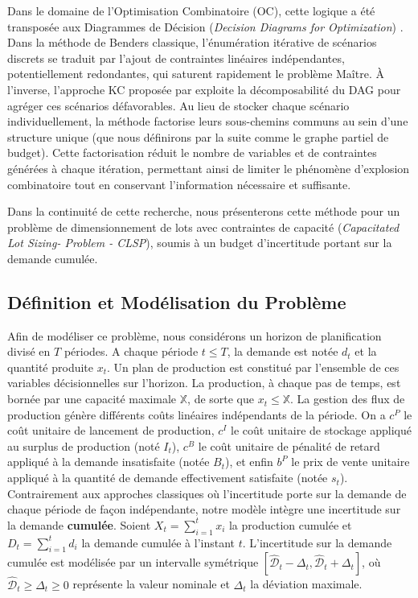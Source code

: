 \documentclass[12pt, a4paper, twoside]{report}
\numberwithin{equation}{section}
\begin{document}
    Dans le domaine de l'Optimisation Combinatoire (OC), cette logique a été transposée aux Diagrammes de Décision (\textit{Decision Diagrams for Optimization}) \cite{bergman2016decision}. Dans la méthode de Benders classique, l'énumération itérative de scénarios discrets se traduit par l'ajout de contraintes linéaires indépendantes, potentiellement redondantes, qui saturent rapidement le problème Maître. À l'inverse, l'approche KC proposée par \cite{portoleauTHESIS} exploite la décomposabilité du DAG pour agréger ces scénarios défavorables. Au lieu de stocker chaque scénario individuellement, la méthode factorise leurs sous-chemins communs au sein d'une structure unique (que nous définirons par la suite comme le graphe partiel de budget). Cette factorisation réduit le nombre de variables et de contraintes générées à chaque itération, permettant ainsi de limiter le phénomène d’explosion combinatoire tout en conservant l'information nécessaire et suffisante.
    
    Dans la continuité de cette recherche, nous présenterons cette méthode pour un problème de dimensionnement de lots avec contraintes de capacité (\textit{Capacitated Lot Sizing- Problem - CLSP}), soumis à un budget d'incertitude portant sur la demande cumulée.

    \subsection{Définition et Modélisation du Problème}
	
	Afin de modéliser ce problème, nous considérons un horizon de planification divisé en $T$ périodes. A chaque période $t\leq T$, la demande est notée $d_t$ et la quantité produite $x_t$. Un plan de production est constitué par l'ensemble de ces variables décisionnelles sur l'horizon. La production, à chaque pas de temps, est bornée par une capacité maximale $\mathbb{X}$, de sorte que $x_t\leq \mathbb{X}$. La gestion des flux de production génère différents coûts linéaires indépendants de la période. On a $c^P$ le coût unitaire de lancement de production, $c^I$ le coût unitaire de stockage appliqué au surplus de production (noté $I_t$), $c^B$ le coût unitaire de pénalité de retard appliqué à la demande insatisfaite (notée $B_t$), et enfin $b^P$ le prix de vente unitaire appliqué à la quantité de demande effectivement satisfaite (notée $s_t$). Contrairement aux approches classiques où l'incertitude porte sur la demande de chaque période de façon indépendante, notre modèle intègre une incertitude sur la demande \textbf{cumulée}. Soient $X_t = \sum_{i=1}^{t}x_i$ la production cumulée et $D_t = \sum_{i=1}^{t}d_i$ la demande cumulée à l'instant $t$. L'incertitude sur la demande cumulée est modélisée par un intervalle symétrique  $[\hat{\mathcal{D}}_t - \Delta_t, \hat{\mathcal{D}}_t + \Delta_t]$, où $\hat{\mathcal{D}}_t \geq \Delta_t \geq 0$ représente la valeur nominale et $\Delta_t$ la déviation maximale.
	
\end{document}
